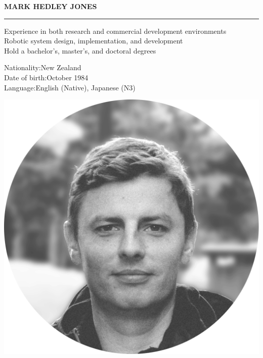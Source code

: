 \documentclass[english]{extarticle}
\begin{document}
{
    \noindent
    \centering
    \Huge\bfseries \textcolor{primary}{MARK HEDLEY JONES}\\
}
\vspace{3mm}
\textcolor{light}{\hrule}
\vspace{3mm}
\noindent
\begin{minipage}[h]{0.78\textwidth}

    \begin{center}
    \begin{minipage}[t]{1.0\textwidth}
    \large
    Experience in both research and commercial development environments\\
    Robotic system design, implementation, and development\\
    Hold a bachelor's, master's, and doctoral degrees\\
    \end{minipage}
    \end{center}


    \vspace{5mm}

    \noindent\begin{center}\parbox[l]{8cm}{
    {Nationality:\hfill{\textmd{\small New Zealand}}}{}\\
    {Date of birth:\hfill{\textmd{\small October 1984}}}{}\\
    {Language:\hfill{\textmd{\small English (Native), Japanese (N3)}}}
    }\end{center}

\end{minipage}
\noindent
\begin{minipage}[h]{0.18\textwidth}
\vspace{5mm}
\includegraphics[width=1.2\textwidth]{Profile.png}
\end{minipage}
\end{document}
